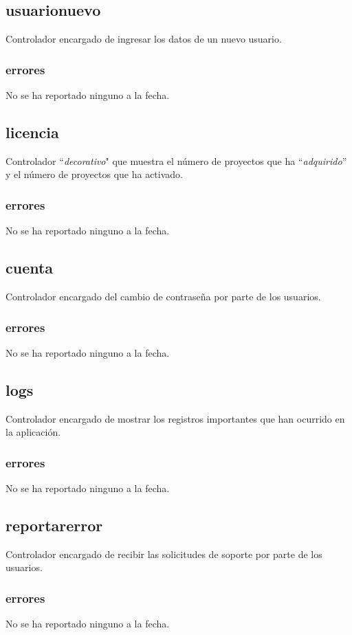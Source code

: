 \documentclass[10pt,a4paper]{book}
\begin{document}
	\subsection{usuarionuevo}
	Controlador encargado de ingresar los datos de un nuevo usuario.
	\subsubsection{errores}
	No se ha reportado ninguno a la fecha.


	\subsection{licencia}
	Controlador ``\textit{decorativo}" que muestra el número de proyectos que ha ``\textit{adquirido}'' y el número de proyectos que ha activado.
	\subsubsection{errores}
	No se ha reportado ninguno a la fecha.

	\subsection{cuenta}
	Controlador encargado del cambio de contraseña por parte de los usuarios.
	\subsubsection{errores}
	No se ha reportado ninguno a la fecha.

	\subsection{logs}
	Controlador encargado de mostrar los registros importantes que han ocurrido en la aplicación.
	\subsubsection{errores}
	No se ha reportado ninguno a la fecha.

	\subsection{reportarerror}
	Controlador encargado de recibir las solicitudes de soporte por parte de los usuarios.
	\subsubsection{errores}
	No se ha reportado ninguno a la fecha.
\end{document}
